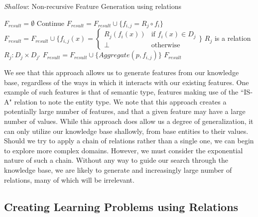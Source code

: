 \documentclass[twoside,11pt]{article}
\theoremstyle{definition}
\begin{document}
\begin{algorithm}[H]
	\caption{\emph{Shallow}: Non-recursive Feature Generation using relations}
	\label{code-compete}
	\small
	\begin{algorithmic}
		\State $F_{result}=\emptyset$
			\State Continue
			\State $F_{result}=F_{result}\cup \{f_{i,j}=R_j\circ f_i\}$
			\State $F_{result}=F_{result}\cup \{f_{i,j}(x)=\begin{cases} R_j( f_i(x)) &\mbox{if } f_i(x)\in D_j\\ 
			\perp & \mbox{otherwise } \end{cases}\}$
		\Else \Comment $R_j$ is a relation $R_j:D_j\times D_{j'}$
		\State $F_{result}=F_{result}\cup \{Aggregate(p,f_{i,j})\}$
		\EndIf
		\EndFor
		\EndFor
		\State \Return $F_{result}$ 
		\EndFunction
		
	\end{algorithmic}
\end{algorithm}

We see that this approach allows us to generate features from our knowledge base, regardless of the ways in which it interacts with our existing features. One example of such features is that of semantic type, features making use of the ``IS-A" relation to note the entity type. We note that this approach creates a potentially large number of features, and that a given feature may have a large number of values. While this approach does allow us a degree of generalization, it can only utilize our knowledge base shallowly, from base entities to their values. 
Should we try to apply a chain of relations rather than a single one, we can begin to explore more complex domains. However, we must consider the exponential nature of such a chain. Without any way to guide our search through the knowledge base, we are likely to generate and increasingly large number of relations, many of which will be irrelevant. 

\subsection{Creating Learning Problems using Relations} \label{algorithm_section} 

\end{document}
